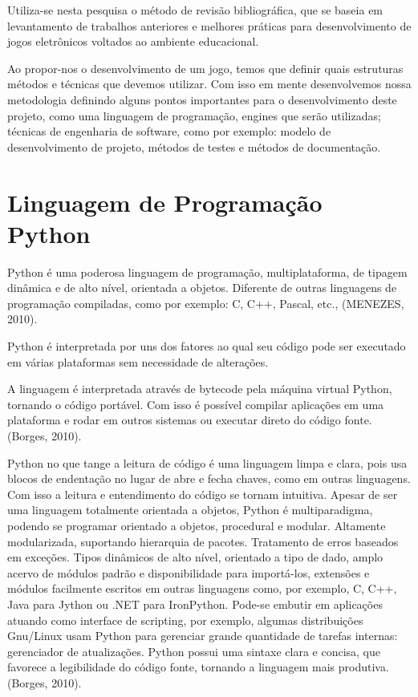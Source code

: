 Utiliza-se nesta pesquisa o método de revisão bibliográfica, que se baseia em levantamento de trabalhos anteriores e melhores práticas para desenvolvimento de jogos eletrônicos voltados ao ambiente educacional.

Ao propor-nos o desenvolvimento de um jogo, temos que definir quais estruturas métodos e técnicas que devemos utilizar. Com isso em mente desenvolvemos nossa metodologia definindo alguns pontos importantes para o desenvolvimento deste projeto, como uma linguagem de programação, engines que serão utilizadas; técnicas de engenharia de software, como por exemplo: modelo de desenvolvimento de projeto, métodos de testes e métodos de documentação.

\section{Linguagem de Programação Python}

Python é uma poderosa linguagem de programação, multiplataforma, de tipagem dinâmica e de alto nível, orientada a objetos. Diferente de outras linguagens de programação compiladas, como por exemplo: C, C++, Pascal, etc., (MENEZES, 2010).

Python é interpretada por uns dos fatores ao qual seu código pode ser executado em várias plataformas sem necessidade de alterações.

A linguagem é interpretada através de bytecode pela máquina virtual Python, tornando o código portável. Com isso é possível compilar aplicações em uma plataforma e rodar em outros sistemas ou executar direto do código fonte. (Borges, 2010).

Python no que tange a leitura de código é uma linguagem limpa e clara, pois usa blocos de endentação no lugar de abre e fecha chaves, como em outras linguagens. Com isso a leitura e entendimento do código se tornam intuitiva. Apesar de ser uma linguagem totalmente orientada a objetos, Python é multiparadigma, podendo se programar orientado a objetos, procedural e modular. Altamente modularizada, suportando hierarquia de pacotes. Tratamento de erros baseados em exceções. Tipos dinâmicos de alto nível, orientado a tipo de dado, amplo acervo de módulos padrão e disponibilidade para importá-los, extensões e módulos facilmente escritos em outras linguagens como, por exemplo, C, C++, Java para Jython ou .NET para IronPython. Pode-se embutir em aplicações atuando como interface de scripting, por exemplo, algumas distribuições Gnu/Linux usam Python para gerenciar grande quantidade de tarefas internas: gerenciador de atualizações. Python possui uma sintaxe clara e concisa, que favorece a legibilidade do código fonte, tornando a linguagem mais produtiva. (Borges, 2010).

